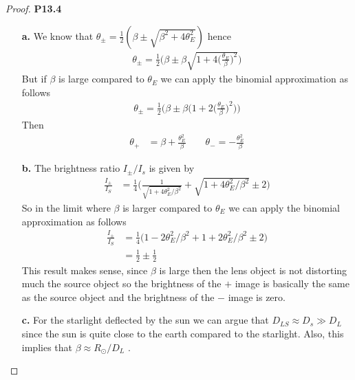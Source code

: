 \documentclass[11pt]{article}
\theoremstyle{definition}
\begin{document}
\cleardoublepage
\begin{proof}{\textbf{P13.4}}
\begin{itemize}
    \item [\textbf{a.}] We know that
    $\theta_\pm = \frac{1}{2}(\beta \pm \sqrt{\beta^2 + 4\theta_E^2})$
    hence
    \begin{align*}
        \theta_\pm
        = \frac{1}{2}\Bigg(
            \beta \pm \beta\sqrt{1 + 4\bigg(\frac{\theta_E}{\beta}\bigg)^2}
        \Bigg)
    \end{align*}
    But if $\beta$ is large compared to $\theta_E$ we can apply the binomial
    approximation as follows
    \begin{align*}
        \theta_\pm
        = \frac{1}{2}\Bigg(
            \beta \pm \beta\bigg(1 + 2\bigg(\frac{\theta_E}{\beta}\bigg)^2\bigg)
        \Bigg)
    \end{align*}
    Then
    \begin{align*}
        \theta_+ &= \beta + \frac{\theta_E^2}{\beta}\qquad
        \theta_- = -\frac{\theta_E^2}{\beta}
    \end{align*}

    \item [\textbf{b.}] The brightness ratio $I_\pm/I_s$ is given by
    \begin{align*}
        \frac{I_{\pm}}{I_S}
        &= \frac{1}{4}\bigg(\frac{1}{\sqrt{1 + 4\theta_E^2/\beta^2}}
        + \sqrt{1 + 4\theta_E^2/\beta^2} \pm 2\bigg)
    \end{align*}
    So in the limit where $\beta$ is larger compared to $\theta_E$ we can apply
    the binomial approximation as follows
    \begin{align*}
        \frac{I_{\pm}}{I_S}
        &= \frac{1}{4}\bigg(1 - 2\theta_E^2/\beta^2
        + 1 + 2\theta_E^2/\beta^2 \pm 2\bigg)\\
        &= \frac{1}{2} \pm \frac{1}{2}
    \end{align*}
    This result makes sense, since $\beta$ is large then the lens object is not
    distorting much the source object so the brightness of the $+$ image is
    basically the same as the source object and the brightness of the $-$
    image is zero.

\cleardoublepage
    \item [\textbf{c.}] For the starlight deflected by the sun we can argue
    that $D_{LS}\approx D_s \gg D_L$ since the sun is quite close to the earth
    compared to the starlight. Also, this implies that
    $\beta \approx R_\odot/D_L$ .


\end{itemize}
\end{proof}
\end{document}
